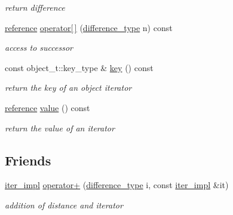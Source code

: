 \begin{DoxyCompactItemize}
\begin{DoxyCompactList}\small\item\em return difference \end{DoxyCompactList}\item 
\hyperlink{classnlohmann_1_1detail_1_1iter__impl_a5be8001be099c6b82310f4d387b953ce}{reference} \hyperlink{classnlohmann_1_1detail_1_1iter__impl_ac0b9276f1102ed4b9cd3f5f56287e3ce}{operator\mbox{[}$\,$\mbox{]}} (\hyperlink{classnlohmann_1_1detail_1_1iter__impl_a2f7ea9f7022850809c60fc3263775840}{difference\+\_\+type} n) const
\begin{DoxyCompactList}\small\item\em access to successor \end{DoxyCompactList}\item 
const object\+\_\+t\+::key\+\_\+type \& \hyperlink{classnlohmann_1_1detail_1_1iter__impl_a15dfb2744fed2ef40c12a9e9a20d6dbc}{key} () const
\begin{DoxyCompactList}\small\item\em return the key of an object iterator \end{DoxyCompactList}\item 
\hyperlink{classnlohmann_1_1detail_1_1iter__impl_a5be8001be099c6b82310f4d387b953ce}{reference} \hyperlink{classnlohmann_1_1detail_1_1iter__impl_ab447c50354c6611fa2ae0100ac17845c}{value} () const
\begin{DoxyCompactList}\small\item\em return the value of an iterator \end{DoxyCompactList}\end{DoxyCompactItemize}
\subsection*{Friends}
\begin{DoxyCompactItemize}
\item 
\hyperlink{classnlohmann_1_1detail_1_1iter__impl}{iter\+\_\+impl} \hyperlink{classnlohmann_1_1detail_1_1iter__impl_a94108d1a7563e103534f23eb5c1ee175}{operator+} (\hyperlink{classnlohmann_1_1detail_1_1iter__impl_a2f7ea9f7022850809c60fc3263775840}{difference\+\_\+type} i, const \hyperlink{classnlohmann_1_1detail_1_1iter__impl}{iter\+\_\+impl} \&it)
\begin{DoxyCompactList}\small\item\em addition of distance and iterator \end{DoxyCompactList}\end{DoxyCompactItemize}


